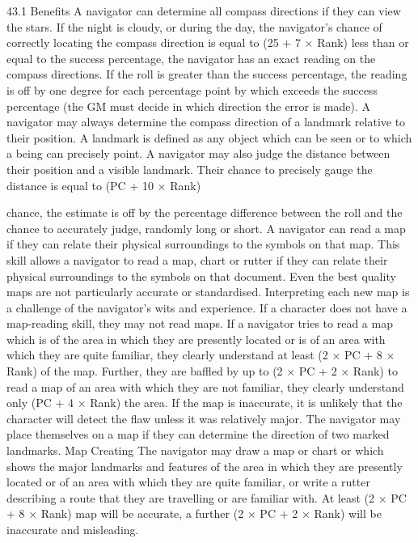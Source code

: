 \documentclass[a4paper]{article}
\begin{document}
\begin{multicols}{3}
43.1 Benefits
A navigator can determine all compass directions if they can view the stars.
If the night is cloudy, or during the day, the navigator’s chance of correctly locating the compass
direction is equal to (25 + 7 × Rank)%
less than or equal to the success percentage, the
navigator has an exact reading on the compass
directions. If the roll is greater than the success
percentage, the reading is off by one degree for
each percentage point by which exceeds the success percentage (the GM must decide in which
direction the error is made).
A navigator may always determine the compass
direction of a landmark relative to their position.
A landmark is defined as any object which can be
seen or to which a being can precisely point. A
navigator may also judge the distance between
their position and a visible landmark. Their chance
to precisely gauge the distance is equal to (PC + 10
× Rank)%

chance, the estimate is off by the percentage difference between the roll and the chance to accurately
judge, randomly long or short.
A navigator can read a map if they can relate
their physical surroundings to the symbols on
that map.
This skill allows a navigator to read a map, chart or
rutter if they can relate their physical surroundings
to the symbols on that document. Even the best
quality maps are not particularly accurate or standardised. Interpreting each new map is a challenge
of the navigator’s wits and experience. If a character does not have a map-reading skill, they may not
read maps.
If a navigator tries to read a map which is of the
area in which they are presently located or is of an
area with which they are quite familiar, they
clearly understand at least (2 × PC + 8 × Rank)%
of the map. Further, they are baffled by up to (2 ×
PC + 2 × Rank)%
to read a map of an area with which they are not
familiar, they clearly understand only (PC + 4 ×
Rank)%
the area. If the map is inaccurate, it is unlikely that
the character will detect the flaw unless it was
relatively major.
The navigator may place themselves on a map if
they can determine the direction of two marked
landmarks.
Map Creating
The navigator may draw a map or chart or which
shows the major landmarks and features of the area
in which they are presently located or of an area
with which they are quite familiar, or write a rutter
describing a route that they are travelling or are
familiar with. At least (2 × PC + 8 × Rank)%
map will be accurate, a further (2 × PC + 2 ×
Rank)%
will be inaccurate and misleading.


\end{multicols}
\end{document}
